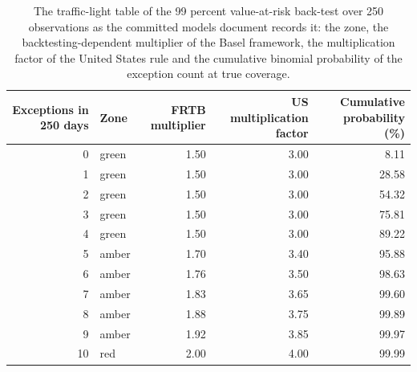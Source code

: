 \begin{table}[htbp]
\centering
\footnotesize
\setlength{\tabcolsep}{3.0pt}
\caption{The traffic-light table of the 99 percent value-at-risk back-test over 250 observations as the committed models document records it: the zone, the backtesting-dependent multiplier of the Basel framework, the multiplication factor of the United States rule and the cumulative binomial probability of the exception count at true coverage.}
\label{tab:market-traffic}
\begin{tabular}{rlrrr}
\toprule
Exceptions in 250 days & Zone & FRTB multiplier & US multiplication factor & Cumulative probability (\%) \\
\midrule
0 & green & 1.50 & 3.00 & 8.11 \\
1 & green & 1.50 & 3.00 & 28.58 \\
2 & green & 1.50 & 3.00 & 54.32 \\
3 & green & 1.50 & 3.00 & 75.81 \\
4 & green & 1.50 & 3.00 & 89.22 \\
5 & amber & 1.70 & 3.40 & 95.88 \\
6 & amber & 1.76 & 3.50 & 98.63 \\
7 & amber & 1.83 & 3.65 & 99.60 \\
8 & amber & 1.88 & 3.75 & 99.89 \\
9 & amber & 1.92 & 3.85 & 99.97 \\
10 & red & 2.00 & 4.00 & 99.99 \\
\bottomrule
\end{tabular}
\end{table}
